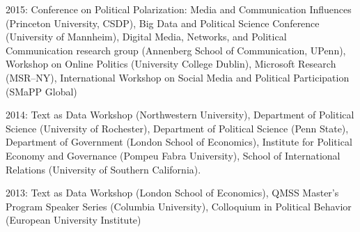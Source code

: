 \documentclass[margin,line,11pt]{resume}
\newcommand{\nl}{\vspace{0.10in}\\}
\begin{document}
\begin{resume}
2015: Conference on Political Polarization: Media and Communication Influences (Princeton University, CSDP), Big Data and Political Science Conference (University of Mannheim), Digital Media, Networks, and Political Communication research group (Annenberg School of Communication, UPenn), Workshop on Online Politics (University College Dublin), Microsoft Research (MSR--NY), International Workshop on Social Media and Political Participation (SMaPP Global)

2014: Text as Data Workshop (Northwestern University), Department of Political Science (University of Rochester), Department of Political Science (Penn State), Department of Government (London School of Economics), Institute for Political Economy and Governance (Pompeu Fabra University), School of International Relations (University of Southern California).

2013: Text as Data Workshop (London School of Economics), QMSS Master's Program Speaker Series (Columbia University), Colloquium in Political Behavior (European University Institute)

   
    
    

    

\end{resume}
\end{document}
